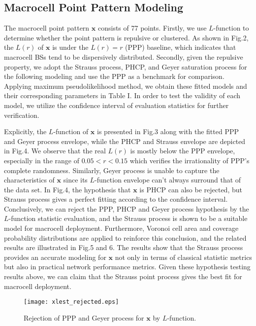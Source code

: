 \documentclass[conference]{IEEEtran}
\begin{document}
\subsection{Macrocell Point Pattern Modeling}

The macrocell point pattern $\mathbf{x}$ consists of 77 points. Firstly, we use $L$-function to determine whether the point pattern is repulsive or clustered. As shown in Fig.2, the $L(r)$ of $\mathbf{x}$ is under the $L(r)=r$ (PPP) baseline, which indicates that macrocell BSs tend to be dispersively distributed. Secondly, given the repulsive property, we adopt the Strauss process, PHCP, and Geyer saturation process for the following modeling and use the PPP as a benchmark for comparison. Applying maximum pseudolikelihood method\cite{baddeley2000practical}, we obtain these fitted models and their corresponding parameters in Table I. In order to test the validity of each model, we utilize the confidence interval of evaluation statistics for further verification.

Explicitly, the $L$-function of $\mathbf{x}$ is presented in Fig.3 along with the fitted PPP and Geyer process envelope, while the PHCP and Strauss envelope are depicted in Fig.4. We observe that the real $L(r)$ is mostly below the PPP envelope, especially in the range of $0.05<r<0.15$ which verifies the irrationality of PPP's complete randomness. Similarly, Geyer process is unable to capture the characteristics of $\mathbf{x}$ since its $L$-function envelope can't always surround that of the data set. In Fig.4, the hypothesis that $\mathbf{x}$ is PHCP can also be rejected, but Strauss process gives a perfect fitting according to the confidence interval. Conclusively, we can reject the PPP, PHCP and Geyer process hypothesis by the $L$-function statistic evaluation, and the Strauss process is shown to be a suitable model for macrocell deployment. Furthermore, Voronoi cell area and coverage probability distributions are applied to reinforce this conclusion, and the related results are illustrated in Fig.5 and 6. The results show that the Strauss process provides an accurate modeling for $\mathbf{x}$ not only in terms of classical statistic metrics but also in practical network performance metrics. Given these hypothesis testing results above, we can claim that the Strauss point process gives the best fit for macrocell deployment.

\begin{figure}[!t]
\centering
\texttt{[image: xlest\_rejected.eps]}
\caption{Rejection of PPP and Geyer process for $\mathbf{x}$ by $L$-function.}
\end{figure}
\end{document}
